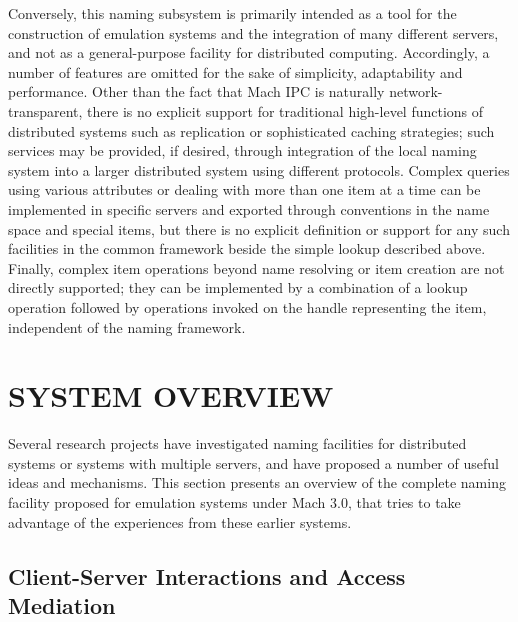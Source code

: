 Conversely, this naming subsystem is primarily intended as a tool for
the construction of emulation systems and the integration of many
different servers, and not as a general-purpose facility for
distributed computing. Accordingly, a number of features are omitted
for the sake of simplicity, adaptability and performance. Other than
the fact that Mach IPC is naturally network-transparent, there is no
explicit support for traditional high-level functions of distributed
systems such as replication or sophisticated caching strategies; such
services may be provided, if desired, through integration of the local
naming system into a larger distributed system using different
protocols.  Complex queries using various attributes or dealing with
more than one item at a time can be implemented in specific servers
and exported through conventions in the name space and special items,
but there is no explicit definition or support for any such facilities
in the common framework beside the simple lookup described above.
Finally, complex item operations beyond name resolving or item
creation are not directly supported; they can be implemented by a
combination of a lookup operation followed by operations invoked on
the handle representing the item, independent of the naming framework.

\section{SYSTEM OVERVIEW}

Several research projects have investigated naming facilities for
distributed systems or systems with multiple servers, and have
proposed a number of useful ideas and
mechanisms\cite{CABRERA87B,CHERITON89,COMER86,GUILLEMONT87,LAMPSON86,LANTZ85,MULLENDER90,TERRY86,WELCH86}.
This section presents an overview of the complete naming facility
proposed for emulation systems under Mach 3.0, that tries to take
advantage of the experiences from these earlier systems.

\subsection{Client-Server Interactions and Access Mediation}


